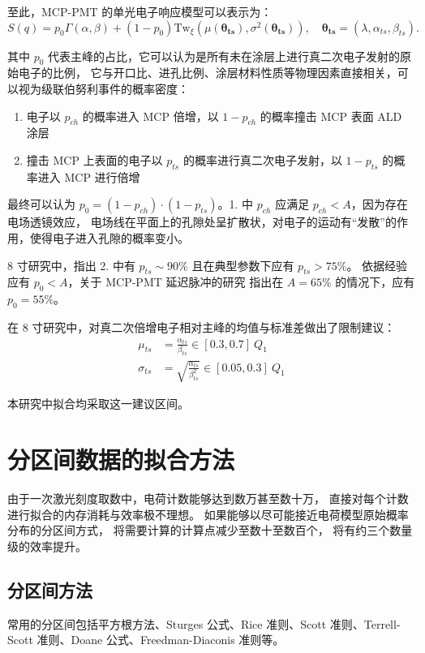 至此，MCP-PMT 的单光电子响应模型可以表示为：
\begin{equation}
    S(q)=p_0\Gamma(\alpha, \beta)+(1-p_0)\mathrm{Tw}_{\xi}
    \left(\mu(\boldsymbol{\theta_{ts}}),\sigma^2(\boldsymbol{\theta_{ts}})\right),\quad
    \boldsymbol{\theta_{ts}}=(\lambda, \alpha_{ts},\beta_{ts}).
\end{equation}

其中 $p_0$ 代表主峰的占比，它可以认为是所有未在涂层上进行真二次电子发射的原始电子的比例，
它与开口比、进孔比例、涂层材料性质等物理因素直接相关，可以视为级联伯努利事件的概率密度：
\begin{enumerate}
    \item 电子以 $p_{ch}$ 的概率进入 MCP 倍增，以 $1-p_{ch}$ 的概率撞击 MCP 表面 ALD 涂层
    \item 撞击 MCP 上表面的电子以 $p_{ts}$ 的概率进行真二次电子发射，以 $1-p_{ts}$ 的概率进入 MCP 进行倍增
\end{enumerate}

最终可以认为 $p_0=(1-p_{ch})\cdot(1-p_{ts})$。1. 中 $p_{ch}$ 应满足 $p_{ch}<A$，因为存在电场透镜效应，
电场线在平面上的孔隙处呈扩散状，对电子的运动有“发散”的作用，使得电子进入孔隙的概率变小。

8 寸研究中，指出 2. 中有 $p_{ts}\sim90\%$ 且在典型参数下应有 $p_{ts}>75\%$。
依据经验应有 $p_0<A$，关于 MCP-PMT 延迟脉冲的研究\cite{chenPhotoelectronBackscatteringMicrochannel2018}
指出在 $A=65\%$ 的情况下，应有 $p_0=55\%$。

在 8 寸研究中，对真二次倍增电子相对主峰的均值与标准差做出了限制建议：
\begin{align}
    \mu_{ts}&=\frac{\alpha_{ts}}{\beta_{ts}}\in[0.3, 0.7]\ Q_1\\
    \sigma_{ts}&=\sqrt{\frac{\alpha_{ts}}{\beta_{ts}^2}}\in[0.05, 0.3]\ Q_1
\end{align}

本研究中拟合均采取这一建议区间。

\section{分区间数据的拟合方法}
由于一次激光刻度取数中，电荷计数能够达到数万甚至数十万，
直接对每个计数进行拟合的内存消耗与效率极不理想。
如果能够以尽可能接近电荷模型原始概率分布的分区间方式，
将需要计算的计算点减少至数十至数百个，
将有约三个数量级的效率提升。

\subsection{分区间方法}
常用的分区间包括平方根方法、Sturges 公式、Rice 准则、Scott 准则、Terrell-Scott 准则、Doane 公式、Freedman-Diaconis 准则等。

